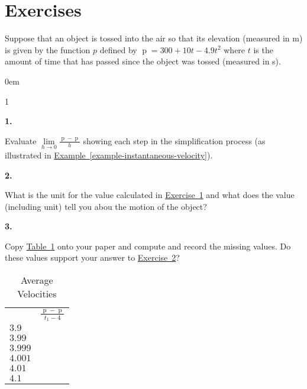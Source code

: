 \documentclass[12pt,]{book}
\theoremstyle{plain}
\theoremstyle{definition}
\numberwithin{equation}{section}
\newcommand{\hrulemedium}{\noalign{\hrule height 0.07em}}
\newcommand{\hrulethick} {\noalign{\hrule height 0.11em}}
\newenvironment{exercisegroup}%
{\medskip\noindent}%
{\par\bigskip}%
\newlength{\exercisegroupindent}%
\newlength{\exercisegroupitemwidth}%
\newenvironment{exercisegrouplist}%
{\vspace{-\partopsep}%
\begin{adjustwidth}{\exercisegroupindent}{0em}}%
{\end{adjustwidth}%
\vspace{-\partopsep}%
\vspace{\baselineskip}}%
\newenvironment{exercisegroupbycol}[1]%
{\begin{exercisegrouplist}%
\vspace{-\multicolsep}%
\begin{multicols}{#1}%
\setlength{\parindent}{0em}%
\setlength{\exercisegroupitemwidth}{\linewidth}}%
{\end{multicols}%
\vspace{-\multicolsep}%
\end{exercisegrouplist}}%
\newenvironment{exercisegroupitem}[1]%
{\begin{minipage}[t]{\exercisegroupitemwidth}
\vspace{0pt}%
{\bfseries#1}%
\rule{0pt}{\baselineskip}}{\strut%
\end{minipage}%
\hspace{\columnsep}}%
\providecommand\phantomsection{}
\newcommand{\fe}[2]{\mathop{{#1}{\left(#2\right)}}}
\begin{document}
\section*{Exercises}\label{exercises-19}

\begin{exercisegroup}%
Suppose that an object is tossed into the air so that its elevation (measured in \si{\meter}) is given by the function \(p\) defined by \(\fe{p}{t}=300+10t-4.9t^2\) where \(t\) is the amount of time that has passed since the object was tossed (measured in \si{\second}).%
\par
\begin{exercisegroupbycol}{1}%
\begin{exercisegroupitem}{1. }\phantomsection\hypertarget{exercise-instantaneous-velocity}{\null}
Evaluate \(\lim\limits_{h\to0}\frac{\fe{p}{4+h}-\fe{p}{4}}{h}\) showing each step in the simplification process (as illustrated in \hyperref[example-instantaneous-velocity]{Example~\ref*{example-instantaneous-velocity}}).%
\end{exercisegroupitem}%
\par%
\begin{exercisegroupitem}{2. }\phantomsection\hypertarget{exercise-instantaneous-velocity-second}{\null}
What is the unit for the value calculated in \hyperref[exercise-instantaneous-velocity]{Exercise~1} and what does the value (including unit) tell you abou the motion of the object?%
\end{exercisegroupitem}%
\par%
\begin{exercisegroupitem}{3. }\phantomsection\hypertarget{exercise-181}{\null}
Copy \hyperref[table-instantaneous-velocity]{Table~\ref*{table-instantaneous-velocity}} onto your paper and compute and record the missing values. Do these values support your answer to \hyperref[exercise-instantaneous-velocity-second]{Exercise~2}?%
\begin{table}
\centering
\caption{Average Velocities\label{table-instantaneous-velocity}}
\begin{tabular}{ll}\hrulethick
\multicolumn{1}{c}{\(t_1\)}&\multicolumn{1}{c}{\(\frac{\fe{p}{t_1}-\fe{p}{4}}{t_1-4}\)}\\\hrulemedium
\(3.9\)&\\
\(3.99\)&\\
\(3.999\)&\\
\(4.001\)&\\
\(4.01\)&\\
\(4.1\)&
\end{tabular}
\end{table}
\end{exercisegroupitem}%
\par%
\end{exercisegroupbycol}%
\end{exercisegroup}%
\typeout{************************************************}
\typeout{************************************************}
\end{document}
